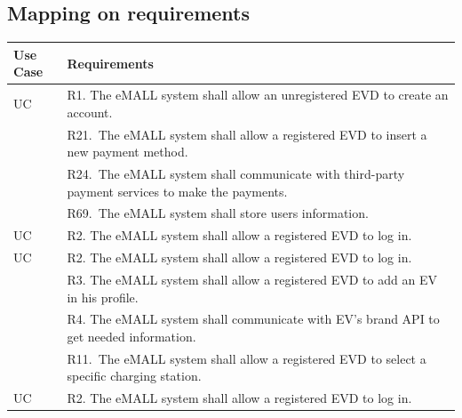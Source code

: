 \subsection{Mapping on requirements}
\label{subsec: map_on_req}%
\setcounter{mr}{1}
\newcommand{\cmr}{\themr\stepcounter{mr}}
\begin{center}
    \begin{longtable}{p{0.12\linewidth}p{0.88\linewidth}}
        \hline
        \textbf{Use Case} & \textbf{Requirements}                                                                                                                           \\
        \hline
        UC\cmr            & R1. The eMALL system shall allow an unregistered EVD to create an account.                                                                      \\
        & R21.\ The eMALL system shall allow a registered EVD to insert a new payment method.                                                             \\
        & R24.\ The eMALL system shall communicate with third-party payment services to make the payments.                                                \\
        & R69.\ The eMALL system shall store users information.                                                                                           \\
        \hline
        UC\cmr            & R2. The eMALL system shall allow a registered EVD to log in.                                                                                    \\
        \hline
        UC\cmr            & R2. The eMALL system shall allow a registered EVD to log in.                                                                                    \\
        & R3. The eMALL system shall allow a registered EVD to add an EV in his profile.                                                                  \\
        & R4. The eMALL system shall communicate with EV’s brand API to get needed information.                                                           \\
        & R11.\ The eMALL system shall allow a registered EVD to select a specific charging station.                                                      \\
        \hline
        UC\cmr            & R2. The eMALL system shall allow a registered EVD to log in.                                                                                    \\

\end{longtable}
\end{center}
